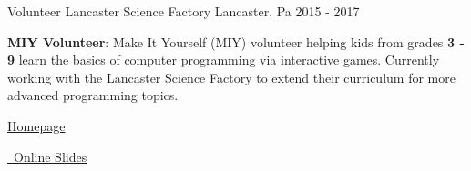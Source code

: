 \begin{cventries}
  \cventry
    {Volunteer}
    {Lancaster Science Factory}
    {Lancaster, Pa}
    {2015 - 2017}
    {
      \begin{cvitems}
        \item {\textbf{MIY Volunteer}: Make It Yourself (MIY) volunteer helping kids from grades \textbf{3 - 9} learn the basics of computer programming via interactive games.  Currently working with the Lancaster Science Factory to extend their curriculum for more advanced programming topics.}
        \item {\href{http://www.lancastersciencefactory.org/}{\faHome Homepage}}
        \item {\href{http://rjfisher.github.io/Science-Factory-Be-A-Programmer/}{\faGithubSquare\ Online Slides}}
      \end{cvitems}
    }
\end{cventries}

\pagebreak
